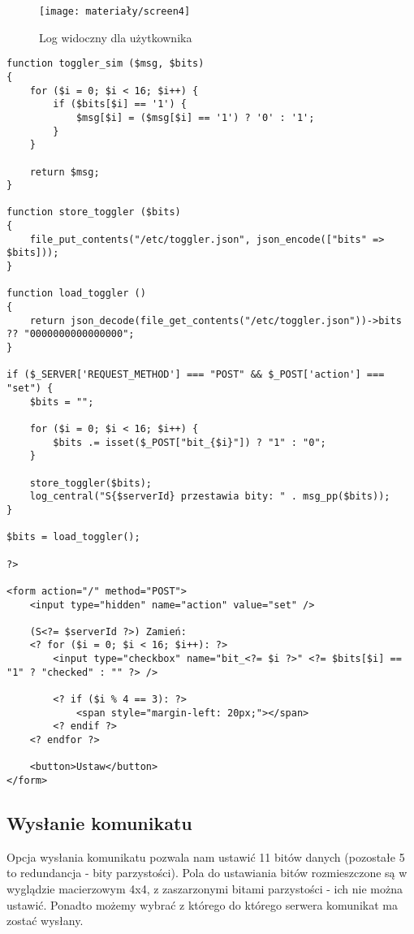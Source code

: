 \begin{figure}[H]
	\centering
	\texttt{[image: materiały/screen4]}
	\caption{Log widoczny dla użytkownika}
\end{figure}

\begin{empty}
	\begin{verbatim}
function toggler_sim ($msg, $bits)
{
	for ($i = 0; $i < 16; $i++) {
		if ($bits[$i] == '1') {
			$msg[$i] = ($msg[$i] == '1') ? '0' : '1';
		}
	}
	
	return $msg;
}

function store_toggler ($bits)
{
	file_put_contents("/etc/toggler.json", json_encode(["bits" => $bits]));
}

function load_toggler ()
{
	return json_decode(file_get_contents("/etc/toggler.json"))->bits ?? "0000000000000000";
}

if ($_SERVER['REQUEST_METHOD'] === "POST" && $_POST['action'] === "set") {
	$bits = "";
	
	for ($i = 0; $i < 16; $i++) {
		$bits .= isset($_POST["bit_{$i}"]) ? "1" : "0";
	}
	
	store_toggler($bits);
	log_central("S{$serverId} przestawia bity: " . msg_pp($bits));
}

$bits = load_toggler();

?>

<form action="/" method="POST">
	<input type="hidden" name="action" value="set" />

	(S<?= $serverId ?>) Zamień: 
	<? for ($i = 0; $i < 16; $i++): ?>
		<input type="checkbox" name="bit_<?= $i ?>" <?= $bits[$i] == "1" ? "checked" : "" ?> />
	
		<? if ($i % 4 == 3): ?>
			<span style="margin-left: 20px;"></span>
		<? endif ?>
	<? endfor ?>
	
	<button>Ustaw</button>
</form>
	\end{verbatim}
	\vspace{-10pt}
\end{empty}

\subsection{Wysłanie komunikatu}
Opcja wysłania komunikatu pozwala nam ustawić 11 bitów danych (pozostałe 5 to redundancja - bity parzystości). Pola do ustawiania bitów rozmieszczone są w wyglądzie macierzowym 4x4, z zaszarzonymi bitami parzystości - ich nie można ustawić. Ponadto możemy wybrać z którego do którego serwera komunikat ma zostać wysłany.

